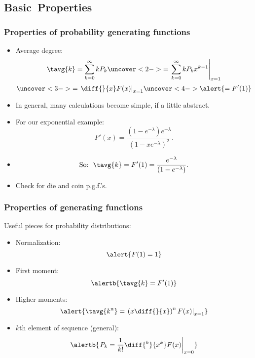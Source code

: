 \subsection{Basic\ Properties}

\begin{frame}[label=]
  \frametitle{Properties of probability generating functions}

  \small

  \begin{itemize}
  \item<1->
    Average degree:
    $$
    \tavg{k} 
    = 
    \sum_{k=0}^\infty k P_k
    \uncover<2->{
      =
      \left. 
        \sum_{k=0}^\infty k P_k x^{k-1} 
      \right|_{x=1}
    }
    $$
    $$
    \uncover<3->{
      =
      \left. 
        \diff{}{x} F(x)
      \right|_{x=1}
    }
    \uncover<4->{
      \alert{
        =
        F'(1)
      }
    }
    $$
  \item<5-> In general, many calculations become simple, if a little abstract.
  \item<6-> For our exponential example:
    $$
    F'(x) = 
    \frac{(1-e^{-\lambda}) e^{-\lambda}}
    {(1-xe^{-\lambda})^2}.
    $$
  \item<7->
    $$
    \mbox{So:} \ \
    \tavg{k} = F'(1) =     
    \frac{e^{-\lambda}}
    {(1-e^{-\lambda})}.
    $$
    \item<8->
      Check for die and coin p.g.f.'s.
  \end{itemize}

\end{frame}

\begin{frame}[label=]
  \frametitle{Properties of generating functions}

  \small
  \begin{block}{Useful pieces for probability distributions:}
  \begin{itemize}
  \item<2->
    Normalization:
    $$ \alert{F(1) = 1} $$
  \item<3->
    First moment:
    $$ \alertb{\tavg{k} = F'(1)} $$
  \item<4->
    Higher moments:
    $$ 
    \alert{
    \tavg{k^n} = 
    \left.
    \left(
      x \diff{}{x}
    \right)^n
    F(x)
    \right|_{x=1}
    }
    $$
  \item<5->
    $k$th element of sequence (general):
    $$
    \alertb{
    \left.
      P_k
      =
      \frac{1}{k!}
      \diff{^{k}}{x^k} F(x)
    \right|_{x=0}
    }
    $$
  \end{itemize}
  \end{block}

\end{frame}

